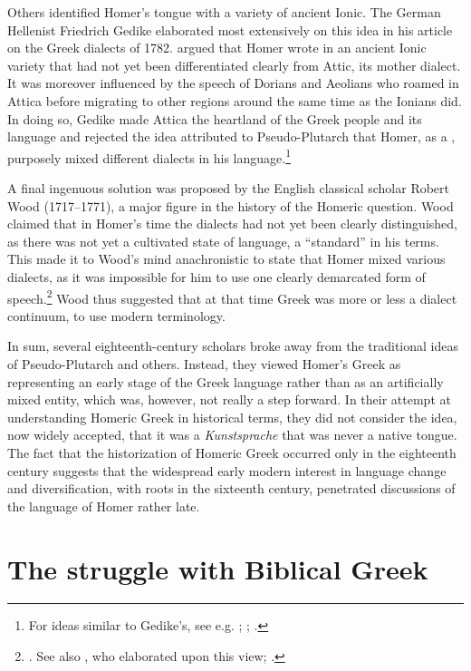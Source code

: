 Others identified Homer’s tongue with a variety of ancient Ionic. The German Hellenist Friedrich Gedike elaborated most extensively on this idea in his article on the Greek dialects of 1782. \citet[22--23]{Gedike1782} argued that Homer wrote in an ancient Ionic variety that had not yet been differentiated clearly from Attic, its mother dialect. It was moreover influenced by the speech of Dorians and Aeolians who roamed in Attica before migrating to other regions around the same time as the Ionians did. In doing so, Gedike made Attica the heartland of the Greek people and its language and rejected the idea attributed to Pseudo-Plutarch that Homer, as a , purposely mixed different dialects in his language.\footnote{For ideas similar to Gedike’s, see e.g. \citet[115--116]{Freret1809}; \citet[202]{Beattie1778}; \citet[175--176]{Trendelenburg1782}.}

A final ingenuous solution was proposed by the English classical scholar Robert Wood (1717–1771), a major figure in the history of the Homeric question. Wood claimed that in Homer’s time the dialects had not yet been clearly distinguished, as there was not yet a cultivated state of language, a “standard” in his terms. This made it to Wood’s mind anachronistic to state that Homer mixed various dialects, as it was impossible for him to use one clearly demarcated form of speech.\footnote{\citet[238]{Wood1775}. See also \citet[\textsc{xxiiii–xxv}]{Harles1778}, who elaborated upon this view; \citet[\textsc{v}]{Facius1782}.} Wood thus suggested that at that time Greek was more or less a dialect continuum, to use modern terminology.

In sum, several eighteenth-century scholars broke away from the traditional ideas of Pseudo-Plutarch and others. Instead, they viewed Homer’s Greek as representing an early stage of the Greek language rather than as an artificially mixed entity, which was, however, not really a step forward. In their attempt at understanding Homeric Greek in historical terms, they did not consider the idea, now widely accepted, that it was a \textit{Kunstsprache} that was never a native tongue. The fact that the historization of Homeric Greek occurred only in the eighteenth century suggests that the widespread early modern interest in language change and diversification, with roots in the sixteenth century, penetrated discussions of the language of Homer rather late.

\section{The struggle with Biblical Greek}\label{sec:4.4}

